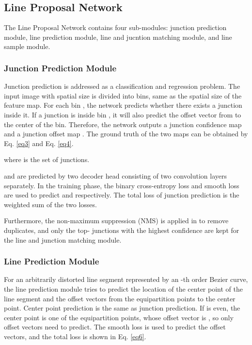 \documentclass[letterpaper, 10 pt, conference]{ieeeconf}
\begin{document}
\subsection{Line Proposal Network} \label{sec3-4}
The Line Proposal Network contains four sub-modules: junction prediction module, line prediction module, line and jucntion matching module, and line sample module.

\subsubsection{\textbf{Junction Prediction Module}} \label{sec3-4-1}
Junction prediction is addressed as a classification and regression problem. The input image with spatial size  is divided into  bins, same as the spatial size of the feature map. For each bin , the network predicts whether there exists a junction inside it. If a junction  is inside bin , it will also predict the offset vector from  to the center  of the bin. Therefore, the network outputs a junction confidence map  and a junction offset map . The ground truth of the two maps can be obtained by Eq. \ref{eq3} and Eq. \ref{eq4}.


where  is the set of junctions.

 and  are predicted by two decoder head consisting of two convolution layers separately. In the training phase, the binary cross-entropy loss and smooth  loss are used to predict  and  respectively. The total loss of junction prediction is the weighted sum of the two losses.


Furthermore, the non-maximum suppression (NMS) is applied in  to remove duplicates, and only the top- junctions with the highest confidence are kept for the line and junction matching module.

\subsubsection{\textbf{Line Prediction Module}} \label{sec3-4-2}
For an arbitrarily distorted line segment represented by an -th order Bezier curve, the line prediction module tries to predict the location of the center point of the line segment and the offset vectors from the equipartition points to the center point. Center point prediction is the same as junction prediction. If  is even, the center point is one of the  equipartition points, whose offset vector is , so only  offset vectors need to predict. The smooth  loss is used to predict the offset vectors, and the total loss is shown in Eq. \ref{eq6}.
\end{document}
